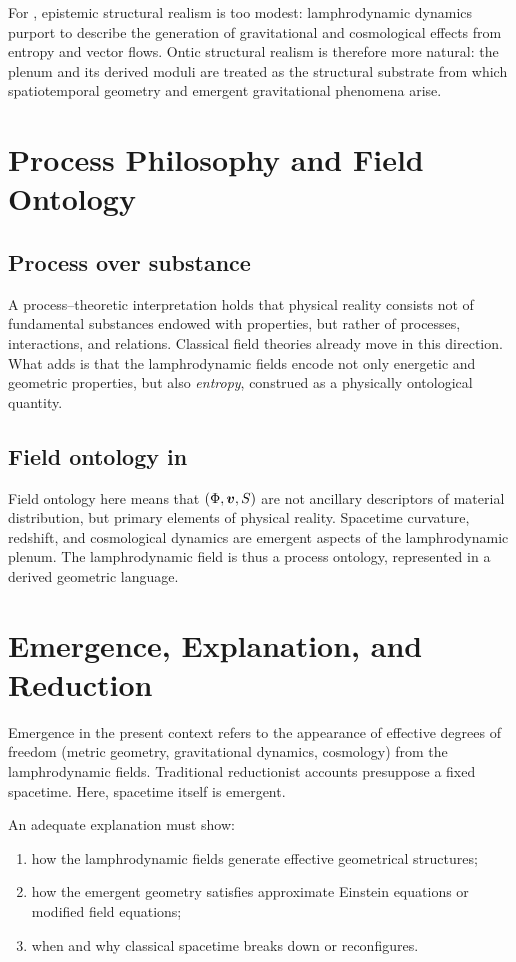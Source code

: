 For \rsvpabbr{}, epistemic structural realism is too modest:
lamphrodynamic dynamics purport to describe the generation of
gravitational and cosmological effects from entropy and vector flows.
Ontic structural realism is therefore more natural: the plenum and its
derived moduli are treated as the structural substrate from which
spatiotemporal geometry and emergent gravitational phenomena arise.

\section{Process Philosophy and Field Ontology}

\subsection{Process over substance}
A process--theoretic interpretation holds that physical reality consists
not of fundamental substances endowed with properties, but rather of
processes, interactions, and relations.  Classical field theories
already move in this direction.  What \rsvpabbr{} adds is that the
lamphrodynamic fields encode not only energetic and geometric
properties, but also \emph{entropy}, construed as a physically
ontological quantity.

\subsection{Field ontology in \rsvpabbr{}}
Field ontology here means that $(\Phi,\bm{v},S)$ are not
ancillary descriptors of material distribution, but primary elements of
physical reality.  Spacetime curvature, redshift, and cosmological
dynamics are emergent aspects of the lamphrodynamic plenum.  The
lamphrodynamic field is thus a process ontology, represented in a
derived geometric language.

\section{Emergence, Explanation, and Reduction}

Emergence in the present context refers to the appearance of effective
degrees of freedom (metric geometry, gravitational dynamics, cosmology)
from the lamphrodynamic fields.  Traditional reductionist accounts
presuppose a fixed spacetime.  Here, spacetime itself is emergent.

An adequate explanation must show:
\begin{enumerate}
\item how the lamphrodynamic fields generate effective geometrical
structures;
\item how the emergent geometry satisfies approximate Einstein
equations or modified field equations;
\item when and why classical spacetime breaks down or reconfigures.
\end{enumerate}


